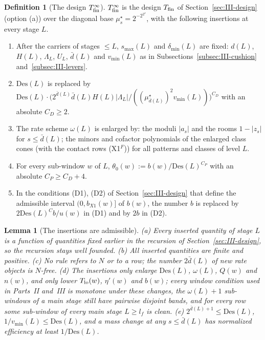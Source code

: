 \documentclass[10pt]{amsart}
\newtheorem{lemma}[theorem]{Lemma}
\theoremstyle{definition}
\newtheorem{definition}[theorem]{Definition}
\theoremstyle{remark}
\begin{document}
\begin{definition}[The design $T^\infty_{\rm fin}$]\label{def:III-designinf}
$T^\infty_{\rm fin}$ is the design $T_{\rm fin}$ of Section~\ref{sec:III-design}
(option (a)) over the diagonal base $\mu^\star_s=2^{-2^{2^s}}$, with the
following insertions at every stage $L$.
\begin{enumerate}
\item[(I1)] After the carriers of stages $\le L$, $s_{\max}(L)$ and
$\delta_{\min}(L)$ are fixed: $d(L)$, $H(L)$, $\Lambda_L$, $U_L$, $\bar d(L)$ and
$v_{\min}(L)$ as in Subsections~\ref{subsec:III-cushion}
and~\ref{subsec:III-levers}.
\item[(I2)] $\mathrm{Des}(L)$ is replaced by $\mathrm{Des}(L)\cdot
\big(2^{\bar d(L)}\bar d(L)H(L)|\Lambda_L|/((\mu^\star_{\bar d(L)})^2v_{\min}(L))
\big)^{C_D}$ with an absolute $C_D\ge2$.
\item[(I3)] The rate scheme $\omega(L)$ is enlarged by: the moduli $|a_s|$ and
the rooms $1-|z_s|$ for $s\le\bar d(L)$; the minors and cofactor polynomials
of the enlarged class cones (with the contact rows (X1$^F$)) for all patterns
and classes of level $L$.
\item[(I4)] For every sub-window $w$ of $L$, $\theta_0(w):=b(w)/\mathrm{Des}(L)^{C_P}$
with an absolute $C_P\ge C_D+4$.
\item[(I5)] In the conditions (D1), (D2) of Section~\ref{sec:III-design} that
define the admissible interval $(0,b_{X1}(w)]$ of $b(w)$, the number $b$ is
replaced by $2\mathrm{Des}(L)^Cb/u(w)$ in (D1) and by $2b$ in (D2).
\end{enumerate}
\end{definition}

\begin{lemma}[The insertions are admissible]\label{lem:III-designinf}
\textup{(a)} Every inserted quantity of stage $L$ is a function of quantities
fixed earlier in the recursion of Section~\textup{\ref{sec:III-design}}, so the
recursion stays well founded.  \textup{(b)} All inserted quantities are finite
and positive.  \textup{(c)} No rule refers to $N$ or to a row; the number
$2\bar d(L)$ of new rate objects is $N$-free.  \textup{(d)} The insertions only
enlarge $\mathrm{Des}(L)$, $\omega(L)$, $Q(w)$ and $n(w)$, and only lower
$T_{\rm lo}(w)$, $\eta'(w)$ and $b(w)$; every window condition used in Parts~II
and~III is monotone under these changes, the $\omega(L)+1$ sub-windows of a
main stage still have pairwise disjoint bands, and for every row some
sub-window of every main stage $L\ge l_f$ is clean.  \textup{(e)}
$2^{\bar d(L)+1}\le\mathrm{Des}(L)$, $1/v_{\min}(L)\le\mathrm{Des}(L)$, and a mass
change at any $s\le\bar d(L)$ has normalized efficiency at least
$1/\mathrm{Des}(L)$.
\end{lemma}
\end{document}
